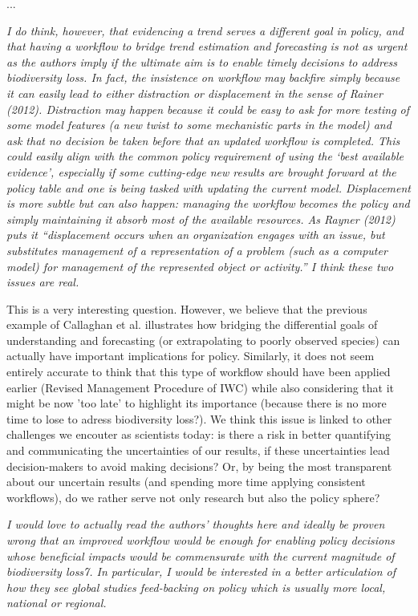 \documentclass[11pt,letter]{article}
\begin{document}
...

\begin{mybox}
\emph{I do think, however, that evidencing a trend serves a different goal in
policy, and that having a workflow to bridge trend estimation and forecasting is not as urgent
as the authors imply if the ultimate aim is to enable timely decisions to address biodiversity
loss. In fact, the insistence on workflow may backfire simply because it can easily lead to either
distraction or displacement in the sense of Rainer (2012). Distraction may happen because it
could be easy to ask for more testing of some model features (a new twist to some mechanistic
parts in the model) and ask that no decision be taken before that an updated workflow is
completed. This could easily align with the common policy requirement of using the ‘best
available evidence’, especially if some cutting-edge new results are brought forward at the
policy table and one is being tasked with updating the current model. Displacement is more
subtle but can also happen: managing the workflow becomes the policy and simply
maintaining it absorb most of the available resources. As Rayner (2012) puts it “displacement
occurs when an organization engages with an issue, but substitutes management of a
representation of a problem (such as a computer model) for management of the represented
object or activity.” I think these two issues are real.} 
\end{mybox}

This is a very interesting question. However, we believe that the previous example of Callaghan et al. illustrates how bridging the differential goals of understanding and forecasting (or extrapolating to poorly observed species) can actually have important implications for policy. Similarly, it does not seem entirely accurate to think that this type of workflow should have been applied earlier (Revised Management Procedure of IWC) while also considering that it might be now 'too late' to highlight its importance (because there is no more time to lose to adress biodiversity loss?). We think this issue is linked to other challenges we encouter as scientists today: is there a risk in better quantifying and communicating the uncertainties of our results, if these uncertainties lead decision-makers to avoid making decisions? Or, by being the most transparent about our uncertain results (and spending more time applying consistent workflows), do we rather serve not only research but also the policy sphere?

\begin{mybox}
\emph{I would love to actually read the authors’ thoughts here and ideally be proven wrong that an
improved workflow would be enough for enabling policy decisions whose beneficial impacts
would be commensurate with the current magnitude of biodiversity loss7. In particular, I
would be interested in a better articulation of how they see global studies feed-backing on
policy which is usually more local, national or regional.}  
\end{mybox}
\end{document}
